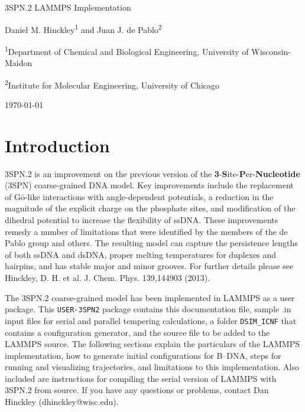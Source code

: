 \documentclass[11pt]{amsart}
\begin{document}
\begin{center}
  \LARGE 
  3SPN.2 LAMMPS Implementation \par \bigskip

  \normalsize
  Daniel M. Hinckley\textsuperscript{1} and Juan J.  de Pablo\textsuperscript{2}  \par \bigskip

  \textsuperscript{1}Department of Chemical and Biological Engineering, University of Wisconsin-Maidon \par
  \textsuperscript{2}Institute for Molecular Engineering, University of Chicago\par \bigskip

  \today
\end{center}

\section{Introduction}

3SPN.2 is an improvement on the previous version of the
\textbf{3}-\textbf{S}ite-\textbf{P}er-\textbf{Nucleotide} (3SPN) coarse-grained
DNA model.  Key improvements include the replacement of G\={o}-like
interactions with angle-dependent potentials, a reduction in the magnitude of
the explicit charge on the phosphate sites, and modification of the dihedral
potential to increase the flexibility of ssDNA.  These improvements remedy a
number of limitations that were identified by the members of the de Pablo group
and others.  The resulting model can capture the persistence lengths of both
ssDNA and dsDNA, proper melting temperatures for duplexes and hairpins, and has
stable major and minor grooves.  For further details please see Hinckley, D. H.
et al. J. Chem. Phys. 139,144903 (2013).

The 3SPN.2 coarse-grained model has been implemented in LAMMPS as a user
package.  This \texttt{USER-3SPN2} package contains this documentation file,
sample .in input files for serial and parallel tempering calculations, a folder
\texttt{DSIM\_ICNF} that contains a configuration generator, and the source
file to be added to the LAMMPS source.  The following sections explain the
particulars of the LAMMPS implementation, how to generate initial
configurations for B--DNA, steps for running and visualizing trajectories, and
limitations to this implementation.  Also included are instructions for
compiling the serial version of LAMMPS with 3SPN.2 from source.  If you have
any questions or problems, contact Dan Hinckley (dhinckley@wisc.edu).
\end{document}
